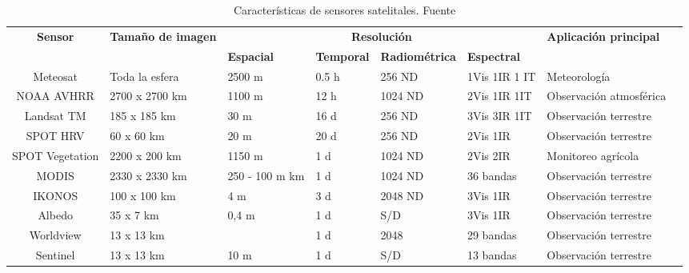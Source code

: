 \begin{table}[H]
    \centering
    \caption{Características de sensores satelitales. Fuente \cite{noauthor_3_nodate}}
    \begin{tabular}{c p{20mm} p{15mm} p{15mm} p{25mm} p{20mm}p{20mm} p{20mm}|}
        \hline
        \hline
        \textbf{Sensor} & \textbf{Tamaño de imagen} & \multicolumn{4}{c}{\textbf{Resolución}} & \textbf{Aplicación principal} \\
        & & \textbf{Espacial} & \textbf{Temporal} & \textbf{Radiométrica} & \textbf{Espectral}  &\\
        \hline \hline
        Meteosat & Toda la esfera & 	2500 m 	& 0.5 h 	& 256 ND 	& 1Vis 1IR 1 IT & Meteorología\\
        \hline
        NOAA AVHRR & 2700 x 2700 km	& 1100 m 	 	& 12 h 	& 1024 ND 	& 2Vis 1IR 1IT & Observación atmosférica\\
        \hline
        Landsat TM 	& 185 x 185 km & 30 m 	 	& 16 d 	& 256 ND 	& 3Vis 3IR 1IT & Observación terrestre\\
        \hline
        SPOT HRV & 60 x 60 km	& 20 m 	 	& 20 d	& 256 ND 	& 2Vis 1IR & Observación terrestre\\
        \hline
        SPOT Vegetation & 2200 x 200 km	& 1150 m 	 	& 1 d	& 1024 ND 	& 2Vis 2IR & Monitoreo agrícola\\
        \hline
        MODIS & 2330 x 2330 km	& 250 - 100 m 	 km 	& 1 d	& 1024 ND 	& 36 bandas & Observación terrestre\\
        \hline
        IKONOS & 100 x 100 km	& 4 m 	 	& 3 d 	& 2048 ND 	& 3Vis 1IR & Observación terrestre\\
        \hline
        Albedo & 35 x 7 km & 0,4 m  & 1 d & S/D & 3Vis 1IR & Observación terrestre\\
        \hline
         Worldview & 13 x 13 km &   & 1 d & 2048 & 29 bandas & Observación terrestre\\
        \hline
         Sentinel & 13 x 13 km &  10 m & 1 d & S/D & 13 bandas & Observación terrestre\\
        \hline
        \hline
    \end{tabular}

\label{Satelites}
\end{table}



